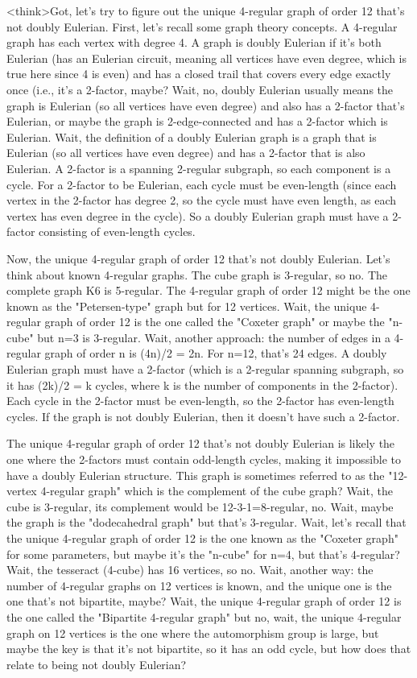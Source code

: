 <think>Got, let's try to figure out the unique 4-regular graph of order 12 that's not doubly Eulerian. First, let's recall some graph theory concepts. A 4-regular graph has each vertex with degree 4. A graph is doubly Eulerian if it's both Eulerian (has an Eulerian circuit, meaning all vertices have even degree, which is true here since 4 is even) and has a closed trail that covers every edge exactly once (i.e., it's a 2-factor, maybe? Wait, no, doubly Eulerian usually means the graph is Eulerian (so all vertices have even degree) and also has a 2-factor that's Eulerian, or maybe the graph is 2-edge-connected and has a 2-factor which is Eulerian. Wait, the definition of a doubly Eulerian graph is a graph that is Eulerian (so all vertices have even degree) and has a 2-factor that is also Eulerian. A 2-factor is a spanning 2-regular subgraph, so each component is a cycle. For a 2-factor to be Eulerian, each cycle must be even-length (since each vertex in the 2-factor has degree 2, so the cycle must have even length, as each vertex has even degree in the cycle). So a doubly Eulerian graph must have a 2-factor consisting of even-length cycles. 

Now, the unique 4-regular graph of order 12 that's not doubly Eulerian. Let's think about known 4-regular graphs. The cube graph is 3-regular, so no. The complete graph K6 is 5-regular. The 4-regular graph of order 12 might be the one known as the "Petersen-type" graph but for 12 vertices. Wait, the unique 4-regular graph of order 12 is the one called the "Coxeter graph" or maybe the "n-cube" but n=3 is 3-regular. Wait, another approach: the number of edges in a 4-regular graph of order n is (4n)/2 = 2n. For n=12, that's 24 edges. A doubly Eulerian graph must have a 2-factor (which is a 2-regular spanning subgraph, so it has (2k)/2 = k cycles, where k is the number of components in the 2-factor). Each cycle in the 2-factor must be even-length, so the 2-factor has even-length cycles. If the graph is not doubly Eulerian, then it doesn't have such a 2-factor. 

The unique 4-regular graph of order 12 that's not doubly Eulerian is likely the one where the 2-factors must contain odd-length cycles, making it impossible to have a doubly Eulerian structure. This graph is sometimes referred to as the "12-vertex 4-regular graph" which is the complement of the cube graph? Wait, the cube is 3-regular, its complement would be 12-3-1=8-regular, no. Wait, maybe the graph is the "dodecahedral graph" but that's 3-regular. Wait, let's recall that the unique 4-regular graph of order 12 is the one known as the "Coxeter graph" for some parameters, but maybe it's the "n-cube" for n=4, but that's 4-regular? Wait, the tesseract (4-cube) has 16 vertices, so no. Wait, another way: the number of 4-regular graphs on 12 vertices is known, and the unique one is the one that's not bipartite, maybe? Wait, the unique 4-regular graph of order 12 is the one called the "Bipartite 4-regular graph" but no, wait, the unique 4-regular graph on 12 vertices is the one where the automorphism group is large, but maybe the key is that it's not bipartite, so it has an odd cycle, but how does that relate to being not doubly Eulerian? 

